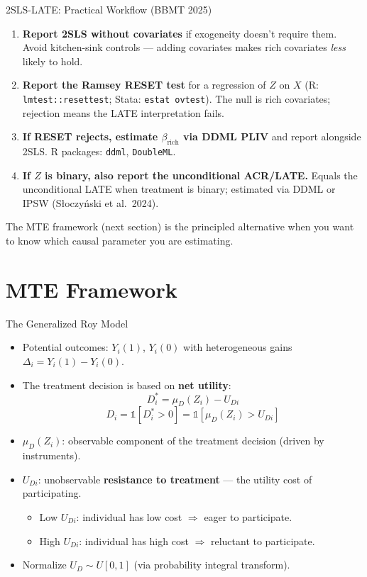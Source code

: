 \documentclass[aspectratio=169, handout]{beamer}
\numberwithin{equation}{section}
\begin{document}
\begin{frame}{2SLS-LATE: Practical Workflow (BBMT 2025)}
\begin{enumerate}\itemsep=4pt
\item \textbf{Report 2SLS without covariates} if exogeneity doesn't require them.  Avoid kitchen-sink controls --- adding covariates makes rich covariates \emph{less} likely to hold.
\item \textbf{Report the Ramsey RESET test} for a regression of $Z$ on $X$ (R: \texttt{lmtest::resettest}; Stata: \texttt{estat ovtest}).  The null is rich covariates; rejection means the LATE interpretation fails.
\item \textbf{If RESET rejects, estimate $\beta_{\text{rich}}$ via DDML PLIV} and report alongside 2SLS.  R packages: \texttt{ddml}, \texttt{DoubleML}.
\item \textbf{If $Z$ is binary, also report the unconditional ACR/LATE.}  Equals the unconditional LATE when treatment is binary; estimated via DDML or IPSW (Słoczyński et al.\ 2024).
\end{enumerate}
\medskip
\small The MTE framework (next section) is the principled alternative when you want to know which causal parameter you are estimating.
\end{frame}


\section{MTE Framework}

\begin{frame}{The Generalized Roy Model}
\begin{itemize}
\item Potential outcomes: $Y_i(1)$, $Y_i(0)$ with heterogeneous gains $\Delta_i=Y_i(1)-Y_i(0)$.
\item The treatment decision is based on \textbf{net utility}:
$$D_i^* = \mu_D(Z_i) - U_{Di}$$
$$D_i = \mathbb{1}[D_i^*>0] = \mathbb{1}[\mu_D(Z_i)>U_{Di}]$$
\item $\mu_D(Z_i)$: observable component of the treatment decision (driven by instruments).
\item $U_{Di}$: unobservable \textbf{resistance to treatment} --- the utility cost of participating.
\begin{itemize}
\item Low $U_{Di}$: individual has low cost $\Rightarrow$ eager to participate.
\item High $U_{Di}$: individual has high cost $\Rightarrow$ reluctant to participate.
\end{itemize}
\item Normalize $U_D\sim U[0,1]$ (via probability integral transform).
\end{itemize}
\end{frame}
\end{document}
